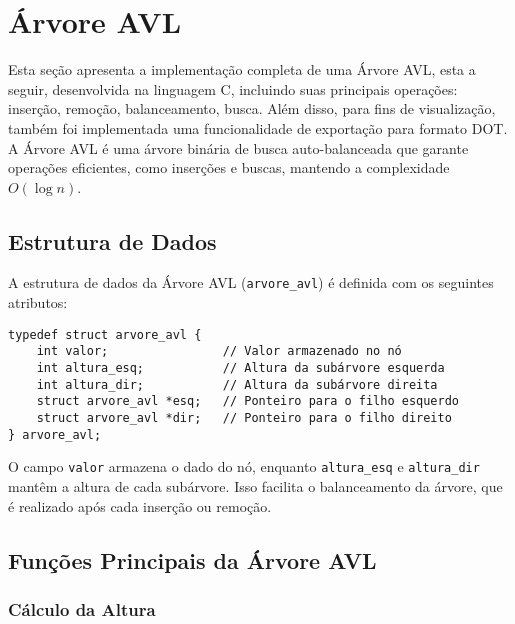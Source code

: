 \section{Árvore AVL}

Esta seção apresenta a implementação completa de uma Árvore AVL, esta a seguir, desenvolvida na linguagem C,
incluindo suas principais operações: inserção, remoção, balanceamento, busca. 
Além disso, para fins de visualização, também foi implementada uma funcionalidade de exportação para formato DOT.
A Árvore AVL é uma árvore binária de busca auto-balanceada que garante operações eficientes, como inserções e buscas, mantendo a complexidade \(O(\log n)\).

\vspace{3mm}

\subsection{Estrutura de Dados}

\vspace{3mm}

A estrutura de dados da Árvore AVL (\texttt{arvore\_avl}) é definida com os seguintes atributos:

\begin{lstlisting}
typedef struct arvore_avl {
    int valor;                // Valor armazenado no nó
    int altura_esq;           // Altura da subárvore esquerda
    int altura_dir;           // Altura da subárvore direita
    struct arvore_avl *esq;   // Ponteiro para o filho esquerdo
    struct arvore_avl *dir;   // Ponteiro para o filho direito
} arvore_avl;
\end{lstlisting}

O campo \texttt{valor} armazena o dado do nó, enquanto \texttt{altura\_esq} e \texttt{altura\_dir} mantêm a altura de cada subárvore. 
Isso facilita o balanceamento da árvore, que é realizado após cada inserção ou remoção.

\vspace{3mm}

\subsection{Funções Principais da Árvore AVL}

\vspace{3mm}

\subsubsection{Cálculo da Altura}


